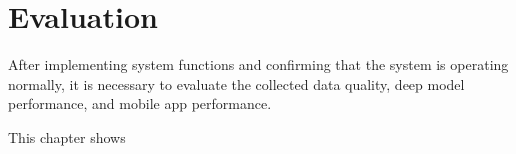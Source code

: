 \chapter{Evaluation}
\label{chap:Evaluation}
After implementing system functions and confirming that the system is operating normally, it is necessary to evaluate the collected data quality, deep model performance, and mobile app performance.

This chapter shows




